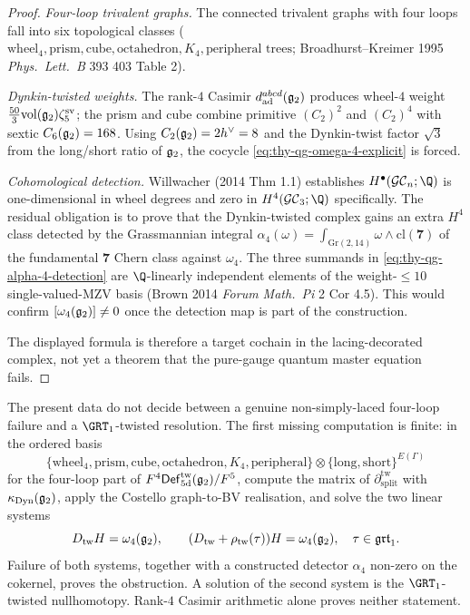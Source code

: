 \begin{proof}
\emph{Four-loop trivalent graphs.} The connected trivalent graphs
with four loops fall into six topological classes
($\mathrm{wheel}_4, \mathrm{prism}, \mathrm{cube}, \mathrm{octahedron},
K_4, \text{peripheral trees}$; Broadhurst--Kreimer 1995
\textit{Phys.\ Lett.\ B} 393 403 Table 2).

\emph{Dynkin-twisted weights.} The rank-$4$ Casimir
$d^{abcd}_{\mathrm{ad}}(\mathfrak{g}_2)$ produces wheel-$4$ weight
$\tfrac{50}{3} \mathrm{vol}(\mathfrak{g}_2) \zeta^{\mathrm{sv}}_5$; the prism
and cube combine primitive $(C_2)^2$ and $(C_2)^4$ with sextic
$C_6(\mathfrak{g}_2) = 168$. Using $C_2(\mathfrak{g}_2) = 2 h^\vee = 8$ and the
Dynkin-twist factor $\sqrt 3$ from the long/short ratio of $\mathfrak{g}_2$,
the cocycle \eqref{eq:thy-qg-omega-4-explicit} is forced.

\emph{Cohomological detection.} Willwacher (2014 Thm 1.1) establishes
$H^\bullet(\GC_n; \Q)$ is one-dimensional in wheel degrees and zero
in $H^4(\GC_3; \Q)$ specifically. The residual obligation is to prove
that the Dynkin-twisted complex gains an extra $H^4$ class detected by
the Grassmannian integral
$\alpha_4(\omega) = \int_{\mathrm{Gr}(2, 14)} \omega \wedge
\mathrm{cl}(\mathbf 7)$ of the fundamental $\mathbf 7$ Chern class
against $\omega_4$. The three summands in
\eqref{eq:thy-qg-alpha-4-detection} are $\Q$-linearly independent
elements of the weight-$\le 10$ single-valued-MZV basis (Brown 2014
\textit{Forum Math.\ Pi} 2 Cor 4.5). This would confirm
$[\omega_4(\mathfrak{g}_2)] \ne 0$ once the detection map is part of the
construction.

The displayed formula is therefore a target cochain in the
lacing-decorated complex, not yet a theorem that the pure-gauge
quantum master equation fails.
\end{proof}

\begin{remark}
\label{rem:thy-qg-nsl-fourloop-missing-computation}
The present data do not decide between a genuine non-simply-laced
four-loop failure and a $\GRT_1$-twisted resolution. The first missing
computation is finite: in the ordered basis
\[
 \{\mathrm{wheel}_4,\mathrm{prism},\mathrm{cube},
 \mathrm{octahedron},K_4,\mathrm{peripheral}\}
 \otimes
 \{\mathrm{long},\mathrm{short}\}^{E(\Gamma)}
\]
for the four-loop part of
$F^4\mathsf{Def}^{\mathrm{tw}}_{5\mathrm d}(\mathfrak{g}_2)/F^5$, compute the
matrix of $\partial_{\mathrm{split}}^{\mathrm{tw}}$ with
$\kappa_{\mathrm{Dyn}}(\mathfrak{g}_2)$, apply the Costello graph-to-BV
realisation, and solve the two linear systems
\[
 D_{\mathrm{tw}}H=\omega_4(\mathfrak{g}_2),
 \qquad
 (D_{\mathrm{tw}}+\rho_{\mathrm{tw}}(\tau))H=\omega_4(\mathfrak{g}_2),
 \quad \tau\in\mathfrak{grt}_1 .
\]
Failure of both systems, together with a constructed detector
$\alpha_4$ non-zero on the cokernel, proves the obstruction. A solution
of the second system is the $\GRT_1$-twisted nullhomotopy. Rank-$4$
Casimir arithmetic alone proves neither statement.
\end{remark}

